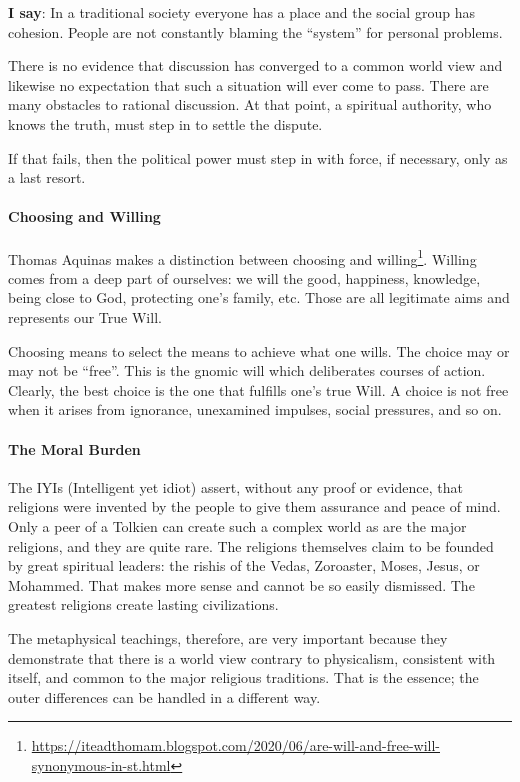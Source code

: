 \textbf{I say}: In a traditional society everyone has a place and the social group has cohesion. People are not constantly blaming the ``system'' for personal problems.

There is no evidence that discussion has converged to a common world view and likewise no expectation that such a situation will ever come to pass. There are many obstacles to rational discussion. At that point, a spiritual authority, who knows the truth, must step in to settle the dispute.

If that fails, then the political power must step in with force, if necessary, only as a last resort.

\paragraph{Choosing and Willing}


Thomas Aquinas makes a distinction between choosing and willing\footnote{\url{https://iteadthomam.blogspot.com/2020/06/are-will-and-free-will-synonymous-in-st.html}}. Willing comes from a deep part of ourselves: we will the good, happiness, knowledge, being close to God, protecting one's family, etc. Those are all legitimate aims and represents our True Will.

Choosing means to select the means to achieve what one wills. The choice may or may not be ``free''. This is the gnomic will which deliberates courses of action. Clearly, the best choice is the one that fulfills one's true Will. A choice is not free when it arises from ignorance, unexamined impulses, social pressures, and so on.

\paragraph{The Moral Burden}


The IYIs (Intelligent yet idiot) assert, without any proof or evidence, that religions were invented by the people to give them assurance and peace of mind. Only a peer of a Tolkien can create such a complex world as are the major religions, and they are quite rare. The religions themselves claim to be founded by great spiritual leaders: the rishis of the Vedas, Zoroaster, Moses, Jesus, or Mohammed. That makes more sense and cannot be so easily dismissed. The greatest religions create lasting civilizations.

The metaphysical teachings, therefore, are very important because they demonstrate that there is a world view contrary to physicalism, consistent with itself, and common to the major religious traditions. That is the essence; the outer differences can be handled in a different way.

